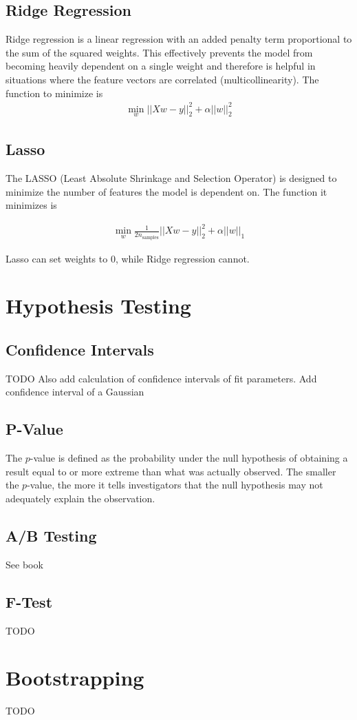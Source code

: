 \subsection{Ridge Regression}
Ridge regression is a linear regression with an added penalty term proportional to the sum of the squared weights. This effectively prevents the model from becoming heavily dependent on a single weight and therefore is helpful in situations where the feature vectors are correlated (multicollinearity). The function to minimize is 
\begin{align}
	\min_w||Xw-y||^2_2 + \alpha||w||^2_2
\end{align}

\subsection{Lasso}
The LASSO (Least Absolute Shrinkage and Selection Operator) is designed to minimize the number of features the model is dependent on. The function it minimizes is 

\begin{align}
	\min_w\frac{1}{2n_{\textrm{samples}}}||Xw-y||^2_2 + \alpha||w||_1
\end{align}

Lasso can set weights to 0, while Ridge regression cannot.

\section{Hypothesis Testing}

\subsection{Confidence Intervals}
TODO
Also add calculation of confidence intervals of fit parameters.
Add confidence interval of a Gaussian

\subsection{P-Value}
The $p$-value is defined as the probability under the null hypothesis of obtaining a result equal to or more extreme than what was actually observed. The smaller the $p$-value, the more it tells investigators that the null hypothesis may not adequately explain the observation.


\subsection{A/B Testing}
See book \cite{grus}


\subsection{F-Test}
TODO

\section{Bootstrapping}
TODO


